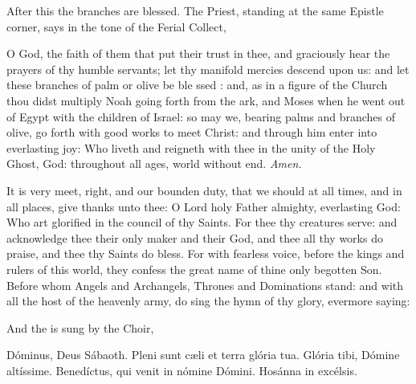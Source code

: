 \begin{rubric}
    After this the branches are blessed. The Priest, standing at the same Epistle corner, says in the tone of the Ferial Collect,
\end{rubric}

{} O God, the faith of them that put their trust in thee, and graciously hear the prayers of thy humble servants; let thy manifold mercies descend upon us: and let these branches of palm or olive be ble {} ssed : and, as in a figure of the Church thou didst multiply Noah going forth from the ark, and Moses when he went out of Egypt with the children of Israel: so may we, bearing palms and branches of olive, go forth with good works to meet Christ: and through him enter into everlasting joy: Who liveth and reigneth with thee in the unity of the Holy Ghost, God: throughout all ages, world without end. \textit{Amen.}\\


\vspace{1\baselineskip}
\par\noindent
It is very meet, right, and our bounden duty, that we should at all times, and in all places, give thanks unto thee: O Lord holy Father almighty, everlasting God: Who art glorified in the council of thy Saints. For thee thy creatures serve: and acknowledge thee their only maker and their God, and thee all thy works do praise, and thee thy Saints do bless. For with fearless voice, before the kings and rulers of this world, they confess the great name of thine only begotten Son. Before whom Angels and Archangels, Thrones and Dominations stand: and with all the host of the heavenly army, do sing the hymn of thy glory, evermore saying:

\begin{rubric}
    And the  is sung by the Choir,
\end{rubric}

{ Dóminus, Deus Sábaoth. Pleni sunt c{\ae}li et terra glória tua. Glória tibi, Dómine altíssime. Benedíctus, {} qui venit in nómine Dómini. Hosánna in excélsis.}


